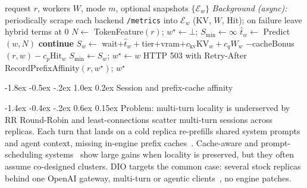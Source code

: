 \documentclass[pdflatex,sn-mathphys-num]{sn-jnl}
\makeatletter
\renewcommand{\section}{\@startsection{section}{1}{\z@}%
  {-1.8ex \@plus -0.5ex \@minus -.2ex}%
  {1.0ex \@plus 0.2ex}%
  {\needspace{4\baselineskip}\normalfont\large\bfseries}}%
\renewcommand{\subsection}{\@startsection{subsection}{2}{\z@}%
  {-1.4ex \@plus -0.4ex \@minus -.2ex}%
  {0.6ex \@plus 0.15ex}%
  {\needspace{3.5\baselineskip}\normalfont\normalsize\bfseries}}%
\makeatother
\begin{document}
\begin{algorithm}[ht]
\caption{Worker selection with hybrid scrape, affinity, and admission}
\label{alg:dio}
\begin{algorithmic}[1]
\Require request $r$, workers $W$, mode $m$, optional snapshots $\{\mathcal{E}_w\}$
\State \emph{Background (async):} periodically scrape each backend \texttt{/metrics}
      into $\mathcal{E}_w$ (KV, $W$, Hit); on failure leave hybrid terms at 0
\State $N \leftarrow$ TokenFeature$(r)$; $w^\star\leftarrow\bot$; $S_{\min}\leftarrow\infty$
  \State $\hat{t}_w \leftarrow$ Predict$(w,N)$
   \textbf{continue}
  \EndIf
  \State $S_w \leftarrow$ wait$+\hat{t}_w+$tier$+$vram$+c_{\mathrm{kv}}\mathrm{KV}_w+c_q W_w$
  \Statex \hspace{\algorithmicindent}$-$cacheBonus$(r,w)-c_p\mathrm{Hit}_w$
   $S_{\min}\leftarrow S_w$; $w^\star\leftarrow w$
  \EndIf
\EndFor
{}
  \State \Return HTTP 503 with Retry-After
\EndIf
\State RecordPrefixAffinity$(r,w^\star)$; \Return $w^\star$
\end{algorithmic}
\end{algorithm}

\section{Session and prefix-cache affinity}
\label{sec:affinity}

\subsection{Problem: multi-turn locality is underserved by RR}
Round-Robin and least-connections scatter multi-turn sessions across replicas.
Each turn that lands on a cold replica re-prefills shared system prompts and agent
context, missing in-engine prefix caches~\cite{radixattention,promptcache,hydragen}.
Cache-aware and prompt-scheduling systems~\cite{preble,cacheblend} show large gains
when locality is preserved, but they often assume co-designed clusters. DIO targets
the common case: several stock replicas behind one OpenAI gateway, multi-turn or
agentic clients~\cite{autogen,langgraph}, no engine patches.
\end{document}
